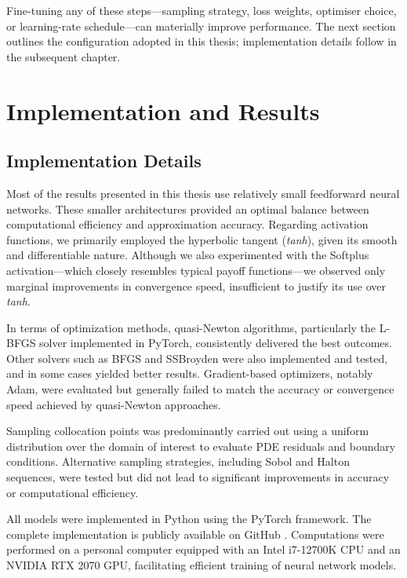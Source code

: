 \documentclass[12pt]{report} %
\theoremstyle{plain}           %
\theoremstyle{definition}      %
\theoremstyle{remark}          %
\begin{document}
Fine-tuning any of these steps—sampling strategy, loss weights, optimiser
choice, or learning-rate schedule—can materially improve performance. The next
section outlines the configuration adopted in this thesis; implementation
details follow in the subsequent chapter.

\chapter{Implementation and Results}

\section{Implementation Details}

Most of the results presented in this thesis use relatively small feedforward neural networks. These smaller 
architectures provided an optimal balance between computational efficiency and approximation accuracy. 
Regarding activation functions, we primarily employed the hyperbolic tangent (\emph{tanh}), given its smooth and differentiable nature. 
Although we also experimented with the Softplus activation—which closely resembles typical payoff functions—we observed only marginal 
improvements in convergence speed, insufficient to justify its use over \emph{tanh}.

In terms of optimization methods, quasi-Newton algorithms, particularly the L-BFGS solver implemented in PyTorch, consistently 
delivered the best outcomes. Other solvers such as BFGS and SSBroyden were also implemented and tested, and in some cases yielded better results. 
Gradient-based optimizers, notably Adam, were evaluated but generally failed to match the 
accuracy or convergence speed achieved by quasi-Newton approaches.

Sampling collocation points was predominantly carried out using a uniform distribution over the domain of interest to evaluate 
PDE residuals and boundary conditions. Alternative sampling strategies, including Sobol and Halton sequences, were tested but 
did not lead to significant improvements in accuracy or computational efficiency.

All models were implemented in Python using the PyTorch framework. The complete implementation is publicly available on 
GitHub \cite{Melo2025pricingpinns}. Computations were performed on a personal computer equipped with an Intel i7-12700K CPU and 
an NVIDIA RTX 2070 GPU, facilitating efficient training of neural network models.
\end{document}
